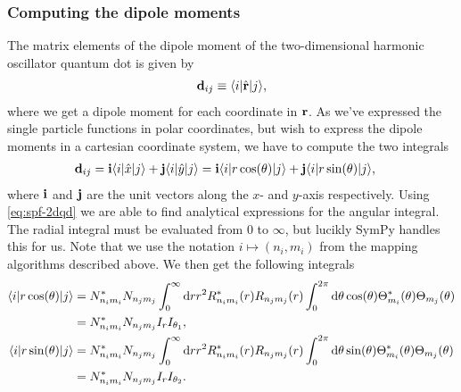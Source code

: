         \subsubsection{Computing the dipole moments}
            The matrix elements of the dipole moment of the two-dimensional
            harmonic oscillator quantum dot is given by
            \begin{align}
                \vf{d}_{ij}
                \equiv \bra{i}\position[\vf{r}]\ket{j},
            \end{align}
            where we get a dipole moment for each coordinate in $\vf{r}$. As
            we've expressed the single particle functions in polar coordinates,
            but wish to express the dipole moments in a cartesian coordinate
            system, we have to compute the two integrals
            \begin{align}
                \vf{d}_{ij}
                &= \vf{i}\bra{i} \position\ket{j}
                + \vf{j}\bra{i} \position[y]\ket{j}
                = \vf{i}\bra{i} r \cos(\theta)\ket{j}
                + \vf{j}\bra{i} r \sin(\theta)\ket{j},
                \label{eq:dipole_elements}
            \end{align}
            where $\vf{i}$ and $\vf{j}$ are the unit vectors along the $x$- and
            $y$-axis respectively.  Using \autoref{eq:spf-2dqd} we are able to
            find analytical expressions for the angular integral. The radial
            integral must be evaluated from $0$ to $\infty$, but lucikly SymPy
            \cite{sympy} handles this for us. Note that we use the notation $i
            \mapsto (n_i, m_i)$ from the mapping algorithms described above. We
            then get the following integrals
            \begin{align}
                \bra{i} r \cos(\theta) \ket{j}
                &= N^{*}_{n_i m_i} N_{n_j m_j}
                \int_{0}^{\infty} \dd r r^2
                R_{n_i m_i}^{*}(r) R_{n_j m_j}(r)
                \int_{0}^{2\pi} \dd \theta \cos(\theta)
                \Theta_{m_i}^{*}(\theta) \Theta_{m_j}(\theta)
                \\
                &= N^{*}_{n_i m_i} N_{n_j m_j} I_{r} I_{\theta_1},
                \\
                \bra{i} r \sin(\theta) \ket{j}
                &= N^{*}_{n_i m_i} N_{n_j m_j}
                \int_{0}^{\infty} \dd r r^2
                R_{n_i m_i}^{*}(r) R_{n_j m_j}(r)
                \int_{0}^{2\pi} \dd \theta \sin(\theta)
                \Theta_{m_i}^{*}(\theta) \Theta_{m_j}(\theta)
                \\
                &= N^{*}_{n_i m_i} N_{n_j m_j} I_{r} I_{\theta_2}.
            \end{align}
